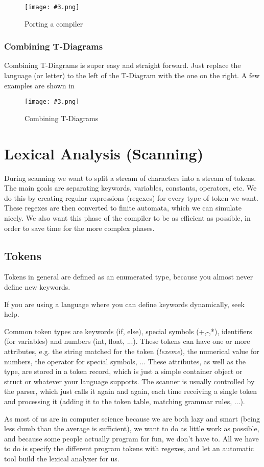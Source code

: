 \documentclass{article}
\newcommand{\fig}[4]{
	\begin{figure}[#1]
		\center
		\texttt{[image: \#3.png]}
		\caption{#4}
		\label{fig:#3}
	\end{figure}
	}
\begin{document}
\fig{h}{0.9}{porting}{Porting a compiler}
\newpage

\subsubsection{Combining T-Diagrams}
Combining T-Diagrams is super easy and straight forward.
Just replace the language (or letter) to the left of the T-Diagram with the one on the right.
A few examples are shown in 

\fig{h}{0.8}{tcombining}{Combining T-Diagrams}

\section{Lexical Analysis (Scanning)}
During scanning we want to split a stream of characters into a stream of tokens.
The main goals are separating keywords, variables, constants, operators, etc.
We do this by creating regular expressions (regexes) for every type of token we want.
These regexes are then converted to finite automata, which we can simulate nicely.
We also want this phase of the compiler to be as efficient as possible, in order to save time for the more complex phases.

\subsection{Tokens}
Tokens in general are defined as an enumerated type, because you almost never define new keywords.
\begin{keypointbox}
	If you are using a language where you can define keywords dynamically, seek help.
\end{keypointbox}

Common token types are keywords (if, else), special symbols (+,-,*), identifiers (for variables) and numbers (int, float, ...).
These tokens can have one or more attributes, e.g. the string matched for the token (\emph{lexeme}), the numerical value for numbers, the operator for special symbols, ...
These attributes, as well as the type, are stored in a token record, which is just a simple container object or struct or whatever your language supports.
The scanner is usually controlled by the parser, which just calls it again and again, each time receiving a single token and processing it (adding it to the token table, matching grammar rules, ...).

As most of us are in computer science because we are both lazy and smart (being less dumb than the average is sufficient), we want to do as little work as possible, and because some people actually program for fun, we don't have to.
All we have to do is specify the different program tokens with regexes, and let an automatic tool build the lexical analyzer for us.
\end{document}
